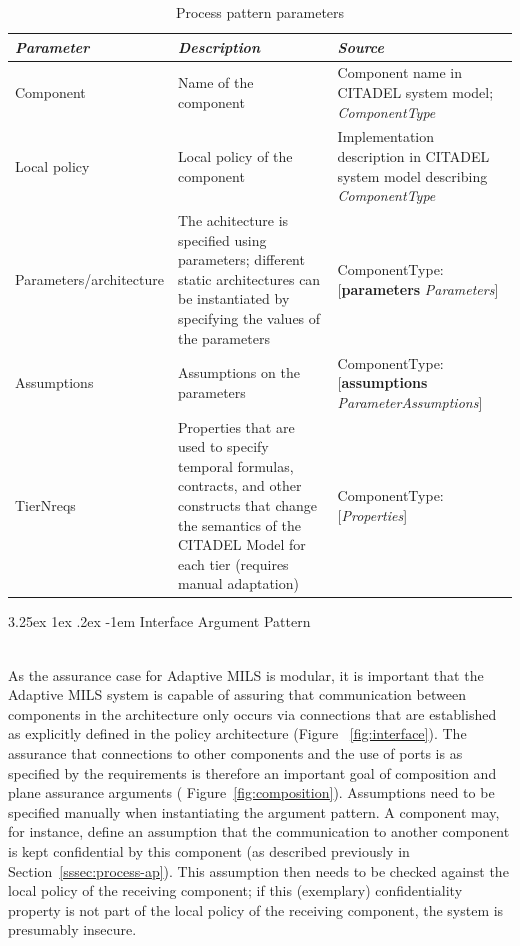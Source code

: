 \documentclass[12pt,twoside,a4paper]{article}
\makeatletter
\renewcommand\paragraph{\@startsection{paragraph}{5}{\z@}%
  {3.25ex \@plus1ex \@minus.2ex}%
  {-1em}%
  {\normalfont\normalsize\bfseries}}
\makeatother
\begin{document}
\begin{table}[htbp]
    \centering
    \caption{Process pattern parameters}
    \begin{tabularx}{\textwidth}{| X | X | X |}
        \hline
        \textit{\textbf{Parameter}}     & \textit{\textbf{Description}}    & \textit{\textbf{Source}}     \\ \hline
        Component        & Name of the component      & Component name in CITADEL system model; \textit{ComponentType}        \\ \hline
        Local policy        & Local policy of the component & Implementation description in CITADEL system model describing \textit{ComponentType}       \\ \hline
        Parameters/architecture        & The achitecture is specified using parameters; different static architectures can be instantiated by specifying the values of the parameters & ComponentType: [\textbf{parameters} \textit{Parameters}]       \\ \hline
        Assumptions        & Assumptions on the parameters & ComponentType: [\textbf{assumptions} \textit{ParameterAssumptions}]        \\ \hline
        TierNreqs        & Properties that are used to specify temporal formulas, contracts, and other constructs that change the semantics of the CITADEL Model for each tier (requires manual adaptation) & ComponentType: [\textit{Properties}]     \\ \hline
    \end{tabularx}
    \label{tab:process_params}
\end{table}

\clearpage
\paragraph{Interface Argument Pattern} \label{sssec:interface-ap}

~\\
As the assurance case for Adaptive MILS is modular, it is important that the Adaptive MILS system is capable of assuring that communication between components in the architecture only occurs via connections that are established as explicitly defined in the policy architecture (Figure ~\ref{fig:interface}). The assurance that connections to other components and the use of ports is as specified by the requirements is therefore an important goal of composition and plane assurance arguments ( Figure~\ref{fig:composition}). Assumptions need to be specified manually when instantiating the argument pattern. A component may, for instance, define an assumption that the communication to another component is kept confidential by this component (as described previously in Section~\ref{sssec:process-ap}). This assumption then needs to be checked against the local policy of the receiving component; if this (exemplary) confidentiality property is not part of the local policy of the receiving component, the system is presumably insecure. 
\end{document}
